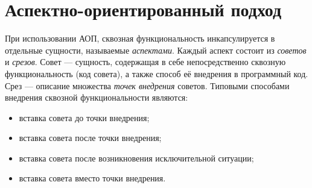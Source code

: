 \documentclass[conference]{IEEEtran}
\begin{document}

\section{Аспектно-ориентированный подход}

При использовании АОП, сквозная функциональность инкапсулируется в отдельные 
сущности, называемые \textit{аспектами}.
Каждый аспект состоит из \textit{советов} и \textit{срезов}. 
Совет --- сущность, содержащая в себе непосредственно сквозную функциональность
(код совета), а также способ её внедрения в программный код.
Срез --- описание множества \textit{точек внедрения} советов. 
Типовыми способами внедрения сквозной функциональности являются:
\begin{itemize}
     \item вставка совета до точки внедрения;
     \item вставка совета после точки внедрения;
     \item вставка совета после возникновения исключительной ситуации;
     \item вставка совета вместо точки внедрения.
\end{itemize}

\end{document}
